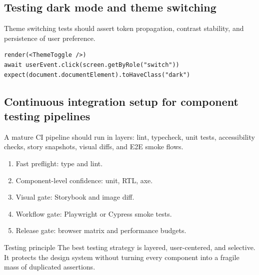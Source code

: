 \subsection{Testing dark mode and theme switching}
Theme switching tests should assert token propagation, contrast stability, and persistence of user preference.

\begin{verbatim}
render(<ThemeToggle />)
await userEvent.click(screen.getByRole("switch"))
expect(document.documentElement).toHaveClass("dark")
\end{verbatim}

\subsection{Continuous integration setup for component testing pipelines}
A mature CI pipeline should run in layers: lint, typecheck, unit tests, accessibility checks, story snapshots, visual diffs, and E2E smoke flows.

\begin{enumerate}[leftmargin=*, itemsep=0.3em]
  \item Fast preflight: type and lint.
  \item Component-level confidence: unit, RTL, axe.
  \item Visual gate: Storybook and image diff.
  \item Workflow gate: Playwright or Cypress smoke tests.
  \item Release gate: browser matrix and performance budgets.
\end{enumerate}

\begin{highlightbox}{Testing principle}
The best testing strategy is layered, user-centered, and selective. It protects the design system without turning every component into a fragile mass of duplicated assertions.
\end{highlightbox}
